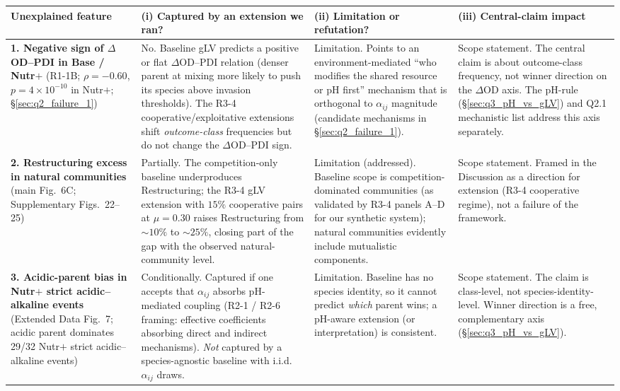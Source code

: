 \documentclass[11pt]{article}
\begin{document}
\begin{center}
\small
\begin{tabular}{p{} p{} p{} p{}}
\toprule
\textbf{Unexplained feature} & \textbf{(i) Captured by an extension we ran?} & \textbf{(ii) Limitation or refutation?} & \textbf{(iii) Central-claim impact} \\
\midrule
\textbf{1. Negative sign of $\Delta$OD--PDI in Base / Nutr$+$} \newline (R1-1B; $\rho = -0.60$, $p = 4 \times 10^{-10}$ in Nutr$+$; \S\ref{sec:q2_failure_1}) &
No. Baseline gLV predicts a positive or flat $\Delta$OD--PDI relation (denser parent at mixing more likely to push its species above invasion thresholds). The R3-4 cooperative/exploitative extensions shift \emph{outcome-class} frequencies but do not change the $\Delta$OD--PDI sign. &
Limitation. Points to an environment-mediated ``who modifies the shared resource or pH first'' mechanism that is orthogonal to $\alpha_{ij}$ magnitude (candidate mechanisms in \S\ref{sec:q2_failure_1}). &
Scope statement. The central claim is about outcome-class frequency, not winner direction on the $\Delta$OD axis. The pH-rule (\S\ref{sec:q3_pH_vs_gLV}) and Q2.1 mechanistic list address this axis separately. \\

\textbf{2. Restructuring excess in natural communities} \newline (main Fig.~6C; Supplementary Figs.~22--25) &
Partially. The competition-only baseline underproduces Restructuring; the R3-4 gLV extension with $15\%$ cooperative pairs at $\mu = 0.30$ raises Restructuring from $\sim 10\%$ to $\sim 25\%$, closing part of the gap with the observed natural-community level. &
Limitation (addressed). Baseline scope is competition-dominated communities (as validated by R3-4 panels A--D for our synthetic system); natural communities evidently include mutualistic components. &
Scope statement. Framed in the Discussion as a direction for extension (R3-4 cooperative regime), not a failure of the framework. \\

\textbf{3. Acidic-parent bias in Nutr$+$ strict acidic--alkaline events} \newline (Extended Data Fig.~7; acidic parent dominates 29/32 Nutr$+$ strict acidic--alkaline events) &
Conditionally. Captured if one accepts that $\alpha_{ij}$ absorbs pH-mediated coupling (R2-1 / R2-6 framing: effective coefficients absorbing direct and indirect mechanisms). \emph{Not} captured by a species-agnostic baseline with i.i.d.\ $\alpha_{ij}$ draws. &
Limitation. Baseline has no species identity, so it cannot predict \emph{which} parent wins; a pH-aware extension (or interpretation) is consistent. &
Scope statement. The claim is class-level, not species-identity-level. Winner direction is a free, complementary axis (\S\ref{sec:q3_pH_vs_gLV}). \\


\end{tabular}
\end{center}
\end{document}

